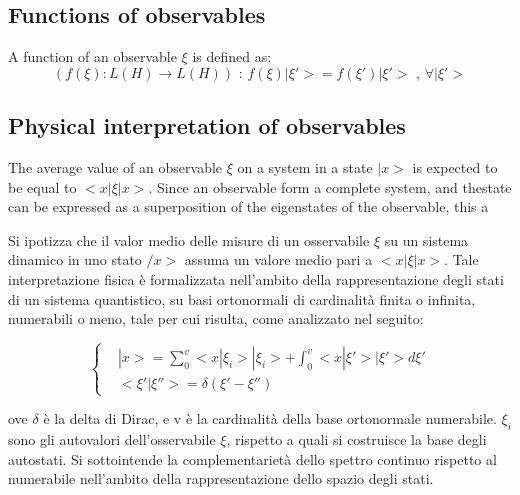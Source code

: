 \documentclass{article}
\begin{document}
\subsection{Functions of observables}

\begin{tcolorbox}[colframe=gray!90, colback=blue!5, coltitle=white, title= \textbf{Definition}: Function of Observables, fonttitle=\large]
    A function of an observable $\xi$ is defined as:
    \begin{equation}
        \text{$(f(\xi): L(H) \rightarrow L(H))$ : $f(\xi)|\xi'>= f(\xi')|\xi'>$ , $\forall |\xi'>$}
    \end{equation}
\end{tcolorbox}

\subsection{Physical interpretation of observables}

The average value of an observable $\xi$ on a system in a state $|x>$ is expected to be equal to $<x|\xi|x>$.
Since an observable form a complete system, and thestate can be expressed as a superposition of the eigenstates of the observable,
this a

Si ipotizza che il valor medio delle misure di un osservabile $\xi$ su un sistema dinamico in uno stato $/x>$
assuma un valore medio pari a $<x|\xi|x>$.
Tale interpretazione fisica è formalizzata nell'ambito della rappresentazione degli stati di un sistema quantistico,
su basi ortonormali di cardinalità finita o infinita, numerabili o meno, tale per cui risulta, come analizzato nel seguito:

\begin{equation}
    \left\{
    \begin{aligned}
         & |x>= \sum_{0}^{v} <x|\xi_i>|\xi_i>+ \int_{0}^{v} <x|\xi'>|\xi'>d\xi' \\
         & <\xi' | \xi''>= \delta(\xi'-\xi'')
    \end{aligned}
    \right.
\end{equation}

ove $\delta$ è la delta di Dirac, e v è la cardinalità della base ortonormale numerabile. $\xi_i$ sono gli autovalori dell'osservabile $\xi$, rispetto a quali si costruisce la base degli autostati.
Si sottointende la complementarietà dello spettro continuo rispetto al numerabile nell'ambito della rappresentazione dello spazio degli stati.
\end{document}
